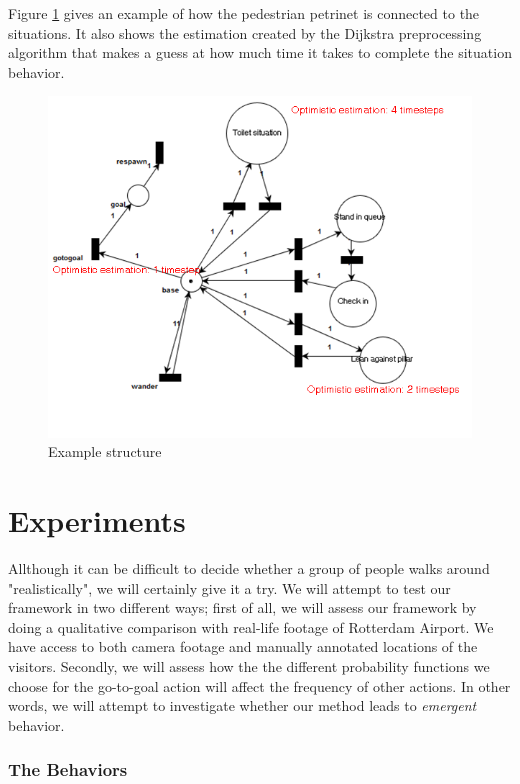 \documentclass[11pt]{book}
\begin{document}
Figure \ref{petrinetexample} gives an example of how the pedestrian petrinet is connected to the situations. It also shows the estimation created by the Dijkstra preprocessing algorithm that makes a guess at how much time it takes to complete the situation behavior.

\begin{figure}
\centering
\includegraphics[width=350pt]{example}
\caption{Example structure}
\label{petrinetexample}
\end{figure}





\chapter{Experiments}
Allthough it can be difficult to decide whether a group of people walks around "realistically", we will certainly give it a try. We will attempt to test our framework in two different ways; first of all, we will assess our framework by doing a qualitative comparison with real-life footage of Rotterdam Airport. We have access to both camera footage and manually annotated locations of the visitors. Secondly, we will assess how the the different probability functions we choose for the go-to-goal action will affect the frequency of other actions. In other words, we will attempt to investigate whether our method leads to \emph{emergent}  behavior.


\subsection{The Behaviors}
\end{document}
